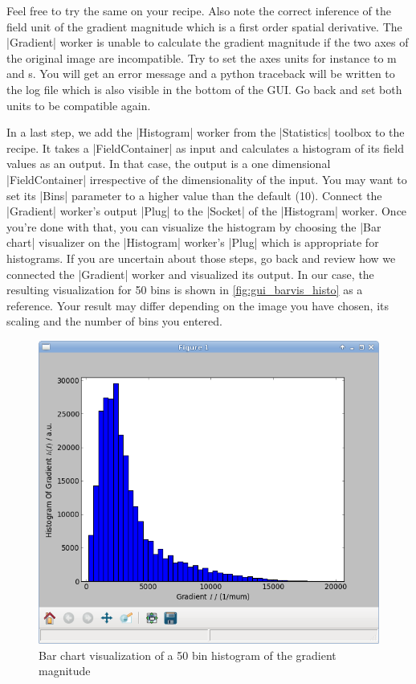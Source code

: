 \documentclass[a4paper]{article}
\begin{document}
Feel free to try the same on your recipe. Also note the correct
inference of the field unit of the gradient magnitude which is a first
order spatial derivative. The |Gradient| worker is unable to calculate
the gradient magnitude if the two axes of the original image are
incompatible. Try to set the axes units for instance to \si{m} and
\si{s}. You will get an error message and a python traceback will be
written to the log file which is also visible in the bottom of the
GUI. Go back and set both units to be compatible again.

In a last step, we add the |Histogram| worker from the |Statistics|
toolbox to the recipe. It takes a |FieldContainer| as input and
calculates a histogram of its field values as an output. In that case,
the output is a one dimensional |FieldContainer| irrespective of the
dimensionality of the input. You may want to set its |Bins| parameter
to a higher value than the default (10). Connect the |Gradient|
worker's output |Plug| to the |Socket| of the |Histogram| worker. Once
you're done with that, you can visualize the histogram by choosing the
|Bar chart| visualizer on the |Histogram| worker's |Plug| which is
appropriate for histograms. If you are uncertain about those steps, go
back and review how we connected the |Gradient| worker and visualized
its output. In our case, the resulting visualization for 50 bins is
shown in \autoref{fig:gui_barvis_histo} as a reference. Your result
may differ depending on the image you have chosen, its scaling and the
number of bins you entered.
\begin{figure}[h]
  \centering
  \includegraphics[scale=0.75]{fig/gui_barvis_histo.png}
  \caption{Bar chart visualization of a 50 bin histogram of the
    gradient magnitude}
  \label{fig:gui_barvis_histo}
\end{figure}
\end{document}
